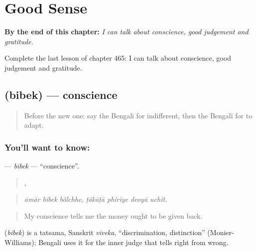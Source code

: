 
\chapter{Good Sense}
\label{ch:bn-good-sense}

\begin{chapteropening}
\textbf{By the end of this chapter:} \emph{I can talk about conscience, good judgement and gratitude.}

Complete the last lesson of chapter 465: I can talk about conscience, good judgement and gratitude.
\end{chapteropening}

\section[\texorpdfstring{\bn{বিবেক} (bibek)}{বিবেক (bibek)}]{ (bibek) — conscience}

\label{lesson:BN-C465-bibek}



\begin{quote}
Before the new one: say the Bengali for indifferent, then the Bengali for to adapt.
\end{quote}

\subsection*{You'll want to know: }
\textbf{} — \emph{bibek} — \textquotedblleft{}conscience\textquotedblright{}.

\begin{quote}
  ,    
\end{quote}

\begin{quote}
\emph{āmār bibek bôlchhe, ṭākāṭā phiriye deoyā uchit.}
\end{quote}

\begin{quote}
My conscience tells me the money ought to be given back.
\end{quote}

\begin{cousinweb}
\textbf{} (\emph{bibek}) is a tatsama, Sanskrit \emph{viveka}, \textquotedblleft{}discrimination, distinction\textquotedblright{} (Monier-Williams); Bengali uses it for the inner judge that tells right from wrong.
\end{cousinweb}

